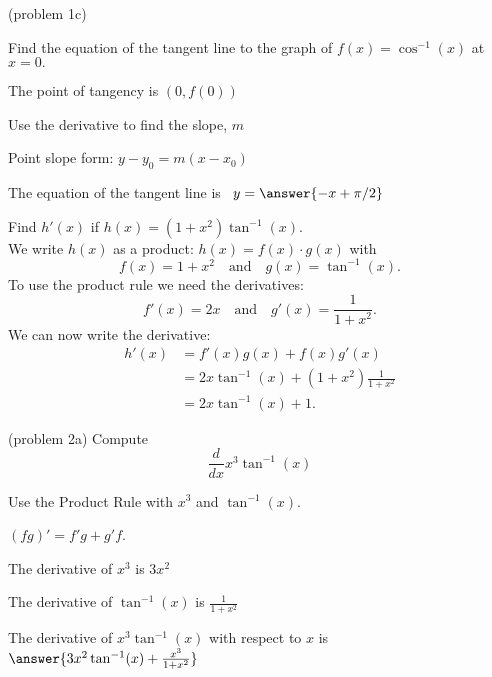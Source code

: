\documentclass[handout]{ximera}
\begin{document}
\begin{problem}(problem 1c)

Find the equation of the tangent line to the graph of $f(x) = \cos^{-1}(x)$ at $x=0.$

\begin{hint}
The point of tangency is $(0, f(0))$
\end{hint}
\begin{hint}
Use the derivative to find the slope, $m$
\end{hint}
\begin{hint}
Point slope form: $y-y_0 = m(x-x_0)$
\end{hint}

The equation of the tangent line is \ $y = \answer{-x + \pi/2}$

\end{problem}


\begin{example}[example 2]
Find $h'(x)$ if $h(x) = (1+x^2)\tan^{-1}(x)$.\\
We write $h(x)$ as a product: $h(x) = f(x)\cdot g(x)$ with
\[f(x) = 1+x^2 \quad \text{and} \quad g(x) = \tan^{-1}(x).\]
To use the product rule we need the derivatives:
\[f'(x) = 2x \quad \text{and} \quad g'(x) = \frac{1}{1+x^2}.\]
We can now write the derivative:
\begin{align*}
h'(x) &= f'(x)g(x) + f(x)g'(x) \\
&= 2x\tan^{-1}(x)  + (1+x^2)\frac{1}{1+x^2} \\
&=  2x\tan^{-1}(x) + 1.
\end{align*}
\end{example}


\begin{center}
\begin{foldable}
\end{foldable}
\end{center}



\begin{problem}(problem 2a)
  Compute
  \[
  \frac{d}{dx} x^3 \tan^{-1}(x)
  \]
  
    \begin{hint}
      Use the Product Rule with $x^3$ and $\tan^{-1}(x)$.
    \end{hint}
    \begin{hint}
      $(fg)' = f'g+g'f$.
    \end{hint}
    \begin{hint}
      The derivative of $x^3$ is $3x^2$
    \end{hint}
    \begin{hint}
      The derivative of $\tan^{-1}(x)$ is $\frac{1}{1+x^2}$
    \end{hint}
		The derivative of $x^3\tan^{-1}(x)$ with respect to $x$ is
		 $\answer{3x^2 \tan^{-1}(x) + \frac{x^3}{1+x^2}}$
		
\end{problem}
\end{document}
